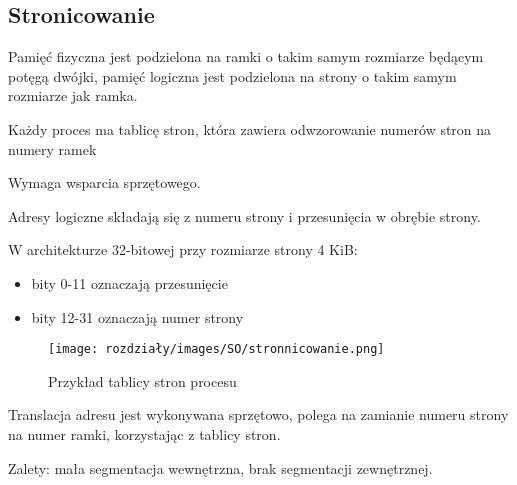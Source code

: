 \subsection{Stronicowanie}

Pamięć fizyczna jest podzielona na ramki o takim samym rozmiarze będącym potęgą dwójki, pamięć logiczna jest podzielona na strony o takim samym rozmiarze jak ramka.

Każdy proces ma tablicę stron, która zawiera odwzorowanie numerów stron na numery ramek

Wymaga wsparcia sprzętowego.

Adresy logiczne składają się z numeru strony i przesunięcia w obrębie strony.
\begin{example}
    W architekturze 32-bitowej przy rozmiarze strony 4 KiB:
    \begin{itemize}
        \vspace{-6pt} \item bity 0-11 oznaczają przesunięcie
        \vspace{-3pt} \item bity 12-31 oznaczają numer strony
    \end{itemize}
\end{example}

\begin{figure}[H]
    \centering
    \texttt{[image: rozdziały/images/SO/stronnicowanie.png]}
    \caption{Przykład tablicy stron procesu}
\end{figure}

Translacja adresu jest wykonywana sprzętowo, polega na zamianie numeru strony na numer ramki, korzystając z tablicy stron.

Zalety: mała segmentacja wewnętrzna, brak segmentacji zewnętrznej.

